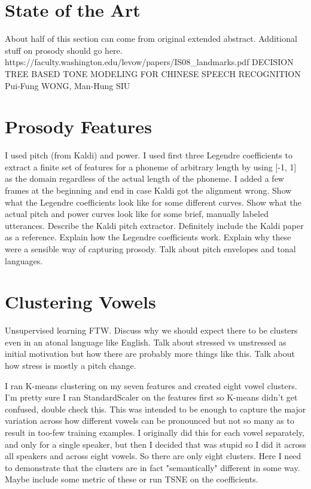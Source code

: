 \documentclass{article}
\begin{document}
\section{State of the Art}
\label{sec:sota}

About half of this section can come from original extended abstract. Additional stuff on prosody should go here. https://faculty.washington.edu/levow/papers/IS08_landmarks.pdf
DECISION TREE BASED TONE MODELING FOR CHINESE SPEECH RECOGNITION
Pui-Fung WONG, Man-Hung SIU

\section{Prosody Features}
\label{sec:prosody}

I used pitch (from Kaldi) and power. I used first three Legendre coefficients to extract a finite set of features for a phoneme of arbitrary length by using [-1, 1] as the domain regardless of the actual length of the phoneme. I added a few frames at the beginning and end in case Kaldi got the alignment wrong. Show what the Legendre coefficients look like for some different curves. Show what the actual pitch and power curves look like for some brief, manually labeled utterances. Describe the Kaldi pitch extractor. Definitely include the Kaldi paper as a reference. Explain how the Legendre coefficients work. Explain why these were a sensible way of capturing prosody. Talk about pitch envelopes and tonal languages.

\section{Clustering Vowels}
\label{sec:vowels}

Unsupervised learning FTW. Discuss why we should expect there to be clusters even in an atonal language like English. Talk about stressed vs unstressed as initial motivation but how there are probably more things like this. Talk about how stress is mostly a pitch change.

I ran K-means clustering on my seven features and created eight vowel clusters. I'm pretty sure I ran StandardScaler on the features first so K-means didn't get confused, double check this. This was intended to be enough to capture the major variation across how different vowels can be pronounced but not so many as to result in too-few training examples. I originally did this for each vowel separately, and only for a single speaker, but then I decided that was stupid so I did it across all speakers and across eight vowels. So there are only eight clusters. Here I need to demonstrate that the clusters are in fact "semantically" different in some way. Maybe include some metric of these or run TSNE on the coefficients.
\end{document}
